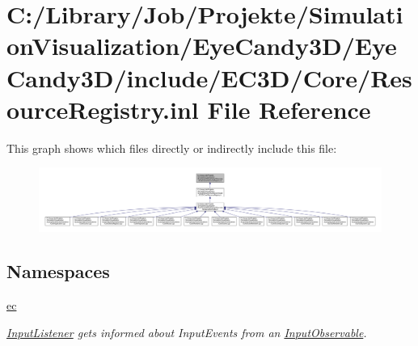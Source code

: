 \hypertarget{_resource_registry_8inl}{}\section{C\+:/\+Library/\+Job/\+Projekte/\+Simulation\+Visualization/\+Eye\+Candy3\+D/\+Eye\+Candy3\+D/include/\+E\+C3\+D/\+Core/\+Resource\+Registry.inl File Reference}
\label{_resource_registry_8inl}
This graph shows which files directly or indirectly include this file\+:\nopagebreak
\begin{figure}[H]
\begin{center}
\leavevmode
\includegraphics[width=350pt]{_resource_registry_8inl__dep__incl}
\end{center}
\end{figure}
\subsection*{Namespaces}
\begin{DoxyCompactItemize}
\item 
 \mbox{\hyperlink{namespaceec}{ec}}
\begin{DoxyCompactList}\small\item\em \mbox{\hyperlink{classec_1_1_input_listener}{Input\+Listener}} gets informed about Input\+Events from an \mbox{\hyperlink{classec_1_1_input_observable}{Input\+Observable}}. \end{DoxyCompactList}\end{DoxyCompactItemize}
